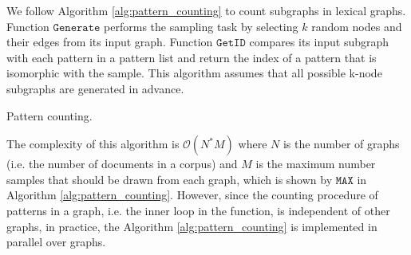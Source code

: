 We follow Algorithm \ref{alg:pattern_counting} to count subgraphs in lexical graphs. 
Function $\mathtt{Generate}$ performs the sampling task by selecting $k$ random nodes and their edges from its input graph. 
Function $\mathtt{GetID}$ compares its input subgraph with each pattern in a pattern list and return the index of a pattern that is isomorphic with the sample. 
This algorithm assumes that all possible k-node subgraphs are generated in advance.  

\begin{algorithm}
    \begin{algorithmic}[1]
                \EndWhile
            \EndWhile
        \EndFunction
    \end{algorithmic}
    \caption{Pattern counting.}
    \label{alg:pattern_counting}
\end{algorithm}

The complexity of this algorithm is $\mathcal{O}(N^ \ast M)$  where $N$ is the number of graphs (i.e. the number of documents in a corpus) and $M$ is the maximum number samples that should be drawn from each graph, which is shown by $\mathtt{MAX}$ in Algorithm \ref{alg:pattern_counting}.
However, since the counting procedure of patterns in a graph, i.e. the inner loop in the function, is independent of other graphs, in practice, the Algorithm \ref{alg:pattern_counting} is implemented in parallel over graphs. 


